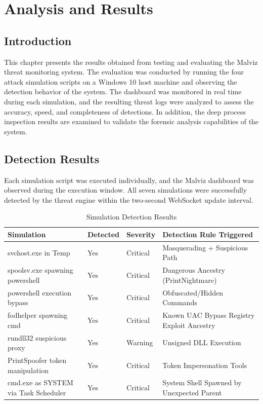 
\chapter{Analysis and Results}\doublespacing

\label{Chapter5}


\section{Introduction}

This chapter presents the results obtained from testing and evaluating the Malviz threat monitoring system. The evaluation was conducted by running the four attack simulation scripts on a Windows 10 host machine and observing the detection behavior of the system. The dashboard was monitored in real time during each simulation, and the resulting threat logs were analyzed to assess the accuracy, speed, and completeness of detections. In addition, the deep process inspection results are examined to validate the forensic analysis capabilities of the system.

\section{Detection Results}

Each simulation script was executed individually, and the Malviz dashboard was observed during the execution window. All seven simulations were successfully detected by the threat engine within the two-second WebSocket update interval.

\begin{table}[H]
\centering
\begin{tabular}{|l|l|l|l|}
\hline
\textbf{Simulation} & \textbf{Detected} & \textbf{Severity} & \textbf{Detection Rule Triggered} \\
\hline
svchost.exe in Temp & Yes & Critical & Masquerading + Suspicious Path \\
spoolsv.exe spawning powershell & Yes & Critical & Dangerous Ancestry (PrintNightmare) \\
powershell execution bypass & Yes & Critical & Obfuscated/Hidden Commands \\
fodhelper spawning cmd & Yes & Critical & Known UAC Bypass Registry Exploit Ancestry \\
rundll32 suspicious proxy & Yes & Warning & Unsigned DLL Execution \\
PrintSpoofer token manipulation & Yes & Critical & Token Impersonation Tools \\
cmd.exe as SYSTEM via Task Scheduler & Yes & Critical & System Shell Spawned by Unexpected Parent \\
\hline
\end{tabular}
\caption{Simulation Detection Results}
\end{table}

